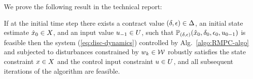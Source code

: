 We prove the following result in the technical report:
\begin{thm}%
	\label{thm:robust-feasible-anytime-RMPC}
	If at the initial time step there exists a contract value $(\delta,\epsilon) \in \Delta$, 
	an initial state estimate $\hat{x}_0 \in X$,
	and an input value $u_{-1} \in U$,
	such that $\mathbb{P}_{(\delta,\epsilon)}(\hat{x}_{0},\delta_{0},\epsilon_{0},u_{0 -1})$
	is feasible then the system (\ref{eq:disc-dynamics}) controlled by
	Alg.~\ref{algo:RMPC-algo} and subjected to disturbances constrained
	by $w_k \in \mathcal{W}$ robustly satisfies the state constraint $x \in X$
	and the control input constraint $u \in U$,
	and all subsequent iterations of the algorithm are feasible.
\end{thm}




